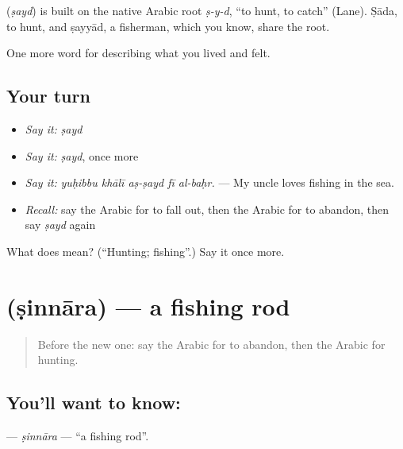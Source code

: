 \begin{cousinweb}
\textbf{} (\emph{ṣayd}) is built on the native Arabic root \emph{ṣ-y-d}, \textquotedblleft{}to hunt, to catch\textquotedblright{} (Lane). Ṣāda, to hunt, and ṣayyād, a fisherman, which you know, share the root.
\end{cousinweb}

\begin{grammarlens}[title={What you've built}]
One more word for describing what you lived and felt.
\end{grammarlens}

\subsection*{Your turn}
\begin{itemize}
\raggedright
  \item \emph{Say it:} \emph{ṣayd}
  \item \emph{Say it:} \emph{ṣayd}, once more
  \item \emph{Say it:} \emph{yuḥibbu khālī aṣ-ṣayd fī al-baḥr.} — My uncle loves fishing in the sea.
  \item \emph{Recall:} say the Arabic for to fall out, then the Arabic for to abandon, then say \emph{ṣayd} again
\end{itemize}

\begin{tcolorbox}[breakable,colback=teal!4,colframe=teal!35!black,title={Before you move on}]
What does  mean? (\textquotedblleft{}Hunting; fishing\textquotedblright{}.) Say it once more.
\end{tcolorbox}
\section[\texorpdfstring{\ar{صنارة} (ṣinnāra)}{صنارة (ṣinnāra)}]{ (ṣinnāra) — a fishing rod}

\label{lesson:AR-C536-sinnara}



\begin{quote}
Before the new one: say the Arabic for to abandon, then the Arabic for hunting.
\end{quote}

\subsection*{You'll want to know: }
\textbf{} — \emph{ṣinnāra} — \textquotedblleft{}a fishing rod\textquotedblright{}.

